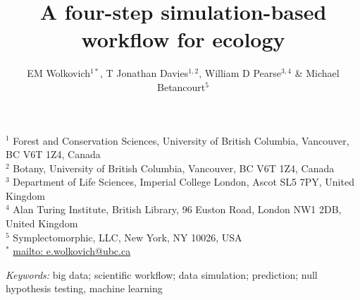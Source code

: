 \documentclass[11pt]{article}
\begin{document}

\renewcommand{\refname}{\CHead{}}


\title{A four-step simulation-based workflow for ecology}
\author{EM Wolkovich$^{1*}$, T Jonathan Davies$^{1,2}$, William D Pearse$^{3,4}$ \& Michael Betancourt$^{5}$}
\maketitle

\noindent $^{1}$ Forest and Conservation Sciences, University of British Columbia, Vancouver, BC V6T 1Z4, Canada\\
$^{2}$ Botany, University of British Columbia, Vancouver, BC V6T 1Z4, Canada\\
$^{3}$ Department of Life Sciences, Imperial College London, Ascot SL5 7PY, United Kingdom \\
$^{4}$ Alan Turing Institute, British Library, 96 Euston Road, London NW1 2DB, United Kingdom \\
$^{5}$ Symplectomorphic, LLC, New York, NY 10026, USA \\
$^{*}$ \url{mailto: e.wolkovich@ubc.ca}
 
\vspace{3ex}
\noindent \emph{Keywords:} big data; scientific workflow; data simulation; prediction; null hypothesis testing, machine learning
\vspace{3ex}
\end{document}
